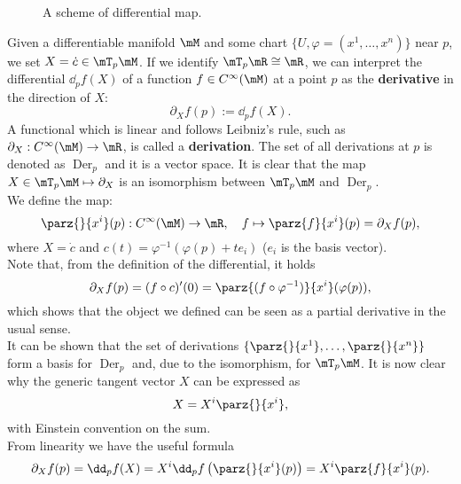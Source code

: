 \begin{figure}[h]
	\label{fig:differential}
	\caption{A scheme of differential map.}
	
\end{figure}

Given a differentiable manifold $\mM$ and some chart $\{U, \varphi=(x^1,\dots,x^n)\}$ near $p$, we set $X=\dot{c}\in\mT_p\mM$. If we identify $\mT_p\mR\cong\mR$, we can interpret the differential $\dd_p f(X)$ of a function $f\in C^\infty(\mM)$ at a point $p$ as the \textbf{derivative} in the direction of $X$:
\[	\partial_X f(p):=\dd_p f(X).	\]
A functional which is linear and follows Leibniz's rule, such as $\partial_X:C^\infty(\mM)\to\mR$, is called a \textbf{derivation}. The set of all derivations at $p$ is denoted as $\operatorname{Der}_p$ and it is a vector space. It is clear that the map $X\in\mT_p\mM\mapsto\partial_X$ is an isomorphism between $\mT_p\mM$ and $\operatorname{Der}_p$.\\
We define the map:
\[	\parz{ }{x^i}(p):C^\infty(\mM)\to\mR,\quad f\mapsto\parz{f}{x^i}(p)=\partial_X f(p),	\]
where $X=\dot{c}$ and $c(t)=\varphi^{-1}(\varphi(p)+te_i)$ ($e_i$ is the basis vector).\\
Note that, from the definition of the differential, it holds
\[ \partial_X f(p)=(f\circ c)'(0)=\parz{(f\circ \varphi^{-1})}{x^i}(\varphi(p)),\]
which shows that the object we defined can be seen as a partial derivative in the usual sense.\\
It can be shown that the set of derivations $\{\parz{ }{x^1},\dots,\parz{ }{x^n}\}$ form a basis for $\operatorname{Der}_p$ and, due to the isomorphism, for $\mT_p\mM$. It is now clear why the generic tangent vector $X$ can be expressed as
\[	X=X^i\parz{ }{x^i},	\]
with Einstein convention on the sum.\\
From linearity we have the useful formula
\[	\partial_X f(p)=\dd_p f(X)=X^i\dd_p f\left(\parz{}{x^i}(p)\right)=X^i\parz{f}{x^i}(p).		\]

